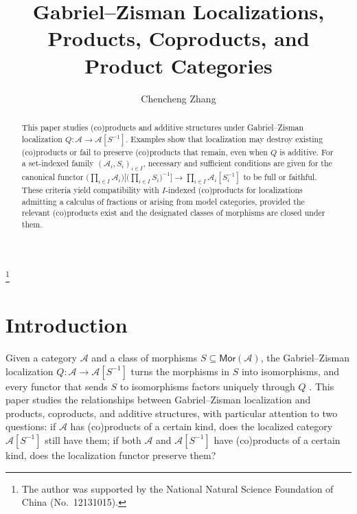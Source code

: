 \documentclass[10pt,a4paper]{amsart}
\theoremstyle{plain}
\theoremstyle{definition}
\theoremstyle{remark}
\begin{document}
\title[Gabriel--Zisman Localizations and (Co)products]{Gabriel--Zisman Localizations, Products, Coproducts, and Product Categories}

\author{Chencheng Zhang}
\address{School of Mathematical Sciences, Shanghai Jiao Tong University, Shanghai 200240, P. R. China}
\thanks{The author was supported by the National Natural Science Foundation of China (No.~12131015).}
\begin{abstract}
  This paper studies (co)products and additive structures under Gabriel--Zisman localization $Q:\mathcal A\longrightarrow\mathcal A[S^{-1}]$.
  Examples show that localization may destroy existing (co)products or fail to preserve (co)products that remain, even when $Q$ is additive.
  For a set-indexed family $(\mathcal A_i,S_i)_{i\in I}$, necessary and sufficient conditions are given for the canonical functor $\big(\prod_{i\in I}\mathcal A_i\big)\big[\big(\prod_{i\in I}S_i\big)^{-1}\big]\longrightarrow\prod_{i\in I}\mathcal A_i[S_i^{-1}]$ to be full or faithful.
  These criteria yield compatibility with $I$-indexed (co)products for localizations admitting a calculus of fractions or arising from model categories, provided the relevant (co)products exist and the designated classes of morphisms are closed under them.
\end{abstract}

\maketitle

\section{Introduction}\label{sec:intro}
Given a category $\mathcal A$ and a class of morphisms $S\subseteq\mathsf{Mor}(\mathcal A)$, the Gabriel--Zisman localization $Q:\mathcal A\longrightarrow\mathcal A[S^{-1}]$ turns the morphisms in $S$ into isomorphisms, and every functor that sends $S$ to isomorphisms factors uniquely through $Q$ \cite[Chapter~I, \S~1, pp.~6--7]{GabrielZisman}.
This paper studies the relationships between Gabriel--Zisman localization and products, coproducts, and additive structures, with particular attention to two questions: if $\mathcal A$ has (co)products of a certain kind, does the localized category $\mathcal A[S^{-1}]$ still have them; if both $\mathcal{A}$ and $\mathcal A[S^{-1}]$ have (co)products of a certain kind, does the localization functor preserve them?
\end{document}
